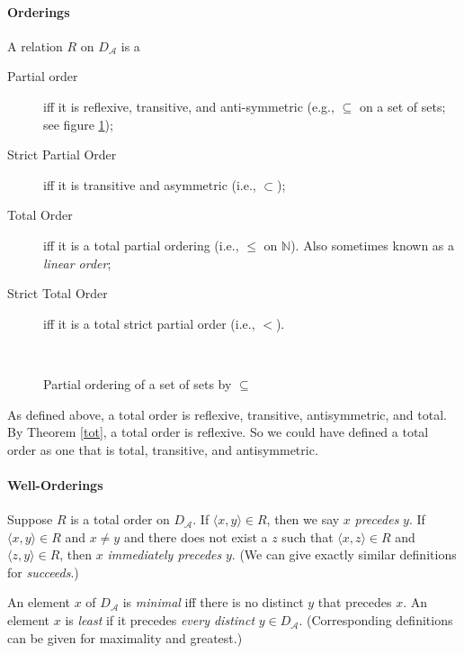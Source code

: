 \paragraph{Orderings}
\begin{definition}[Ordering]
	A relation $R$ on $D_{\mathscr{A}}$ is a \begin{description}
		\item [Partial order] iff it is reflexive, transitive, and anti-symmetric (e.g., $\subseteq$ on a set of sets; see figure \ref{fthree});
		\item [Strict Partial Order] iff it is transitive and asymmetric (i.e., $\subset$);
		\item [Total Order] iff it is a total partial ordering (i.e., $\leqslant$ on $\mathbb{N}$). Also sometimes known as a \emph{linear order};
		\item [Strict Total Order] iff it is a total strict partial order (i.e., $<$).
	\end{description} 
\end{definition}

\begin{figure}
	\centering ~{
	}\caption{Partial ordering of a set of sets by $\subseteq$\label{fthree}}
\end{figure}

As defined above, a total order is reflexive, transitive, antisymmetric, and total. By Theorem \ref{tot}, a total order is reflexive. So we could have defined a total order as one that is total, transitive, and antisymmetric.

\paragraph{Well-Orderings}

Suppose $R$ is a total order on $D_{\mathscr{A}}$. If $\langle x,y\rangle\in R$, then we say $x$ \emph{precedes} $y$. If $\langle x,y\rangle \in R$ and $x\neq y$ and there does not exist a $z$ such that $\langle x,z\rangle \in R$ and $\langle z,y\rangle \in R$, then $x$ \emph{immediately precedes} $y$. (We can give exactly similar definitions for \emph{succeeds}.)

An element $x$ of $D_{\mathscr{A}}$ is \emph{minimal} iff there is no distinct $y$ that precedes $x$. An element $x$ is \emph{least} if it precedes \emph{every distinct} $y \in D_{\mathscr{A}}$. (Corresponding definitions can be given for maximality and greatest.)

